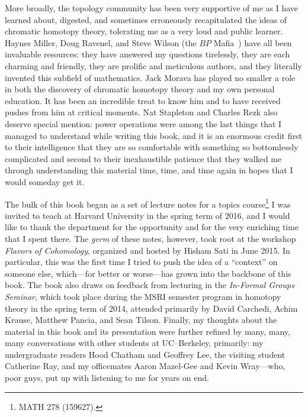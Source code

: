 More broadly, the topology community has been very supportive of me as I have learned about, digested, and sometimes erroneously recapitulated the ideas of chromatic homotopy theory, tolerating me as a very loud and public learner.  Haynes Miller, Doug Ravenel, and Steve Wilson (the $BP$ Mafia~\cite{HopkinsOnRavenel}) have all been invaluable resources: they have answered my questions tirelessly, they are each charming and friendly, they are prolific and meticulous authors, and they literally invented this subfield of mathematics.  Jack Morava has played no smaller a role in both the discovery of chromatic homotopy theory and my own personal education.  It has been an incredible treat to know him and to have received pushes from him at critical moments.  Nat Stapleton and Charles Rezk also deserve special mention: power operations were among the last things that I managed to understand while writing this book, and it is an enormous credit first to their intelligence that they are so comfortable with something so bottomlessly complicated and second to their inexhaustible patience that they walked me through understanding this material time, time, and time again in hopes that I would someday get it.

The bulk of this book began as a set of lecture notes for a topics course\footnote{MATH 278 (159627).} I was invited to teach at Harvard University in the spring term of 2016, and I would like to thank the department for the opportunity and for the very enriching time that I spent there.  The \emph{germ} of these notes, however, took root at the workshop \textit{Flavors of Cohomology}, organized and hosted by Hisham Sati in June 2015.  In particular, this was the first time I tried to push the idea of a ``context'' on someone else, which---for better or worse---has grown into the backbone of this book.  The book also draws on feedback from lecturing in the \textit{In-Formal Groups Seminar}, which took place during the MSRI semester program in homotopy theory in the spring term of 2014, attended primarily by David Carchedi, Achim Krause, Matthew Pancia, and Sean Tilson.  Finally, my thoughts about the material in this book and its presentation were further refined by many, many, many conversations with other students at UC--Berkeley, primarily: my undergraduate readers Hood Chatham and Geoffrey Lee, the visiting student Catherine Ray, and my officemates Aaron Mazel-Gee and Kevin Wray---who, poor guys, put up with listening to me for years on end.

